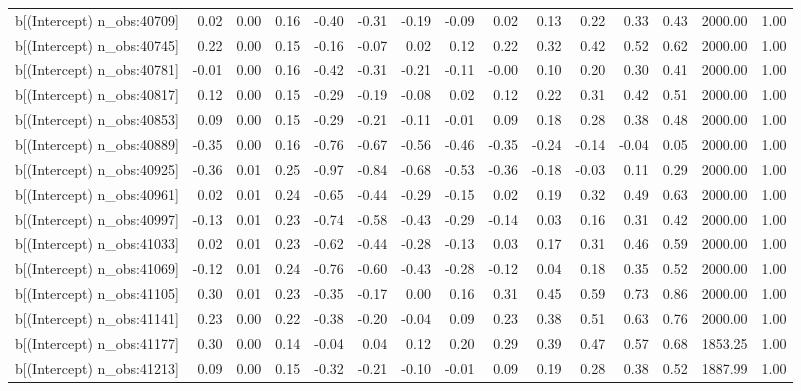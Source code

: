 \begin{table}[ht]
\begin{tabular}{rrrrrrrrrrrrrrr}
  b[(Intercept) n\_obs:40709] & 0.02 & 0.00 & 0.16 & -0.40 & -0.31 & -0.19 & -0.09 & 0.02 & 0.13 & 0.22 & 0.33 & 0.43 & 2000.00 & 1.00 \\ 
  b[(Intercept) n\_obs:40745] & 0.22 & 0.00 & 0.15 & -0.16 & -0.07 & 0.02 & 0.12 & 0.22 & 0.32 & 0.42 & 0.52 & 0.62 & 2000.00 & 1.00 \\ 
  b[(Intercept) n\_obs:40781] & -0.01 & 0.00 & 0.16 & -0.42 & -0.31 & -0.21 & -0.11 & -0.00 & 0.10 & 0.20 & 0.30 & 0.41 & 2000.00 & 1.00 \\ 
  b[(Intercept) n\_obs:40817] & 0.12 & 0.00 & 0.15 & -0.29 & -0.19 & -0.08 & 0.02 & 0.12 & 0.22 & 0.31 & 0.42 & 0.51 & 2000.00 & 1.00 \\ 
  b[(Intercept) n\_obs:40853] & 0.09 & 0.00 & 0.15 & -0.29 & -0.21 & -0.11 & -0.01 & 0.09 & 0.18 & 0.28 & 0.38 & 0.48 & 2000.00 & 1.00 \\ 
  b[(Intercept) n\_obs:40889] & -0.35 & 0.00 & 0.16 & -0.76 & -0.67 & -0.56 & -0.46 & -0.35 & -0.24 & -0.14 & -0.04 & 0.05 & 2000.00 & 1.00 \\ 
  b[(Intercept) n\_obs:40925] & -0.36 & 0.01 & 0.25 & -0.97 & -0.84 & -0.68 & -0.53 & -0.36 & -0.18 & -0.03 & 0.11 & 0.29 & 2000.00 & 1.00 \\ 
  b[(Intercept) n\_obs:40961] & 0.02 & 0.01 & 0.24 & -0.65 & -0.44 & -0.29 & -0.15 & 0.02 & 0.19 & 0.32 & 0.49 & 0.63 & 2000.00 & 1.00 \\ 
  b[(Intercept) n\_obs:40997] & -0.13 & 0.01 & 0.23 & -0.74 & -0.58 & -0.43 & -0.29 & -0.14 & 0.03 & 0.16 & 0.31 & 0.42 & 2000.00 & 1.00 \\ 
  b[(Intercept) n\_obs:41033] & 0.02 & 0.01 & 0.23 & -0.62 & -0.44 & -0.28 & -0.13 & 0.03 & 0.17 & 0.31 & 0.46 & 0.59 & 2000.00 & 1.00 \\ 
  b[(Intercept) n\_obs:41069] & -0.12 & 0.01 & 0.24 & -0.76 & -0.60 & -0.43 & -0.28 & -0.12 & 0.04 & 0.18 & 0.35 & 0.52 & 2000.00 & 1.00 \\ 
  b[(Intercept) n\_obs:41105] & 0.30 & 0.01 & 0.23 & -0.35 & -0.17 & 0.00 & 0.16 & 0.31 & 0.45 & 0.59 & 0.73 & 0.86 & 2000.00 & 1.00 \\ 
  b[(Intercept) n\_obs:41141] & 0.23 & 0.00 & 0.22 & -0.38 & -0.20 & -0.04 & 0.09 & 0.23 & 0.38 & 0.51 & 0.63 & 0.76 & 2000.00 & 1.00 \\ 
  b[(Intercept) n\_obs:41177] & 0.30 & 0.00 & 0.14 & -0.04 & 0.04 & 0.12 & 0.20 & 0.29 & 0.39 & 0.47 & 0.57 & 0.68 & 1853.25 & 1.00 \\ 
  b[(Intercept) n\_obs:41213] & 0.09 & 0.00 & 0.15 & -0.32 & -0.21 & -0.10 & -0.01 & 0.09 & 0.19 & 0.28 & 0.38 & 0.52 & 1887.99 & 1.00 \\ 

\end{tabular}
\end{table}
